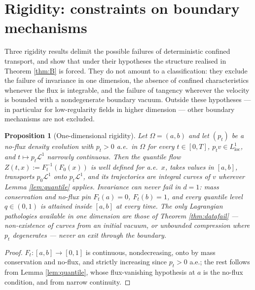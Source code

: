 \documentclass[11pt]{amsart}
\newtheorem{proposition}[theorem]{Proposition}
\theoremstyle{definition}
\newcommand{\LL}[1]{\mathcal{L}^{#1}}
\begin{document}
\section{Rigidity: constraints on boundary mechanisms}
\label{sec:rigidity}

Three rigidity results delimit the possible failures of deterministic
confined transport, and show that under their hypotheses the
structure realised in Theorem \ref{thm:B} is forced. They do not
amount to a classification: they exclude the failure of invariance
in one dimension, the absence of confined characteristics whenever
the flux is integrable, and the failure of tangency wherever the
velocity is bounded with a nondegenerate boundary vacuum. Outside
these hypotheses --- in particular for low-regularity fields in
higher dimension --- other boundary mechanisms are not excluded.

\begin{proposition}[One-dimensional rigidity]\label{prop:1d}
Let $\Omega=(a,b)$ and let $(p_t)$ be a no-flux density evolution
with $p_t>0$ a.e.\ in $\Omega$ for \emph{every} $t\in[0,T]$,
$p_tv\in L^1_{\mathrm{loc}}$, and $t\mapsto p_t\LL{1}$ narrowly
continuous. Then the quantile flow $Z(t,x):=F_t^{-1}(F_0(x))$ is
well defined for a.e.\ $x$, takes values in $[a,b]$, transports
$p_0\LL{1}$ onto $p_t\LL{1}$, and its trajectories are integral
curves of $v$ wherever Lemma \ref{lem:quantile} applies. Invariance
can never fail in $d=1$: mass conservation and no-flux pin
$F_t(a)=0$, $F_t(b)=1$, and every quantile level $q\in(0,1)$ is
attained inside $[a,b]$ at every time. The only Lagrangian
pathologies available in one dimension are those of Theorem
\ref{thm:datafail} --- non-existence of curves from an initial
vacuum, or unbounded compression where $p_t$ degenerates --- never
an exit through the boundary.
\end{proposition}

\begin{proof}
$F_t:[a,b]\to[0,1]$ is continuous, nondecreasing, onto by mass
conservation and no-flux, and strictly increasing since $p_t>0$
a.e.; the rest follows from Lemma \ref{lem:quantile}, whose
flux-vanishing hypothesis at $a$ is the no-flux condition, and from
narrow continuity.
\end{proof}
\end{document}
